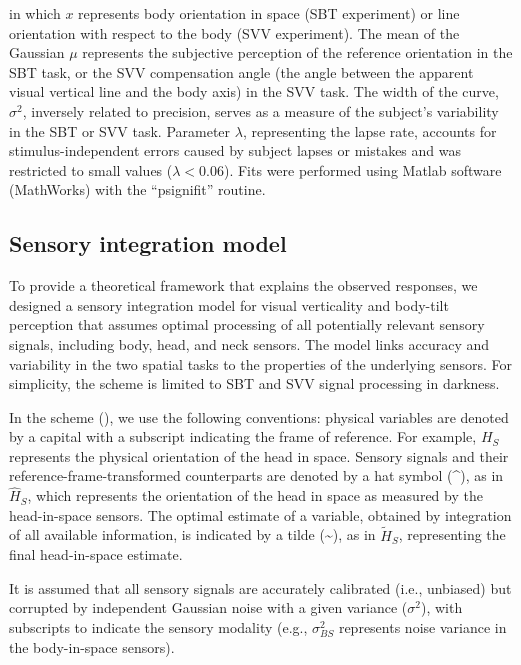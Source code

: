 in which $x$ represents body orientation in space (SBT experiment) or line orientation with respect to the body (SVV experiment). The mean of the Gaussian $\mu$ represents the subjective perception of the reference orientation in the SBT task, or the SVV compensation angle (the angle between the apparent visual vertical line and the body axis) in the SVV task. The width of the curve, $\sigma^2$, inversely related to precision, serves as a measure of the subject's variability in the SBT or SVV task. Parameter $\lambda$, representing the lapse rate, accounts for stimulus-independent errors caused by subject lapses or mistakes and was restricted to small values ($\lambda < 0.06$). Fits were performed using Matlab software (MathWorks) with the ``psignifit'' \cite{wichmann2001b} routine.

\subsection{Sensory integration model}

To provide a theoretical framework that explains the observed responses, we designed a sensory integration model for visual verticality and body-tilt perception that assumes optimal processing of all potentially relevant sensory signals, including body, head, and neck sensors. The model links accuracy and variability in the two spatial tasks to the properties of the underlying sensors. For simplicity, the scheme is limited to SBT and SVV signal processing in darkness.

In the scheme (), we use the following conventions: physical variables are denoted by a capital with a subscript indicating the frame of reference. For example, $H_S$ represents the physical orientation of the head in space. Sensory signals and their reference-frame-transformed counterparts are denoted by a hat symbol (\textasciicircum), as in $\hat{H}_{S}$, which represents the orientation of the head in space as measured by the head-in-space sensors. The optimal estimate of a variable, obtained by integration of all available information, is indicated by a tilde (\textasciitilde), as in $\tilde{H}_S$, representing the final head-in-space estimate.

It is assumed that all sensory signals are accurately calibrated (i.e., unbiased) but corrupted by independent Gaussian noise with a given variance ($\sigma^2$), with subscripts to indicate the sensory modality (e.g., $\sigma_{BS}^2$ represents noise variance in the body-in-space sensors).

